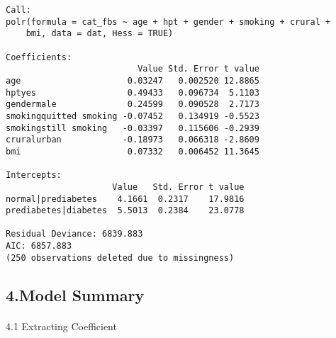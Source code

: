 \documentclass[
  letterpaper,
  DIV=11,
  numbers=noendperiod]{scrartcl}
\makeatletter
\let\oldparagraph\paragraph
\renewcommand{\paragraph}{
    \@ifstar
      \xxxParagraphStar
      \xxxParagraphNoStar
  }
\newcommand{\xxxParagraphStar}[1]{\oldparagraph*{#1}\mbox{}}
\newcommand{\xxxParagraphNoStar}[1]{\oldparagraph{#1}\mbox{}}
\makeatother
\begin{document}
\begin{verbatim}
Call:
polr(formula = cat_fbs ~ age + hpt + gender + smoking + crural + 
    bmi, data = dat, Hess = TRUE)

Coefficients:
                          Value Std. Error t value
age                     0.03247   0.002520 12.8865
hptyes                  0.49433   0.096734  5.1103
gendermale              0.24599   0.090528  2.7173
smokingquitted smoking -0.07452   0.134919 -0.5523
smokingstill smoking   -0.03397   0.115606 -0.2939
cruralurban            -0.18973   0.066318 -2.8609
bmi                     0.07332   0.006452 11.3645

Intercepts:
                     Value   Std. Error t value
normal|prediabetes    4.1661  0.2317    17.9816
prediabetes|diabetes  5.5013  0.2384    23.0778

Residual Deviance: 6839.883 
AIC: 6857.883 
(250 observations deleted due to missingness)
\end{verbatim}

\subsection{4.Model Summary}\label{model-summary}

\paragraph{4.1 Extracting Coefficient}\label{extracting-coefficient}
\end{document}
